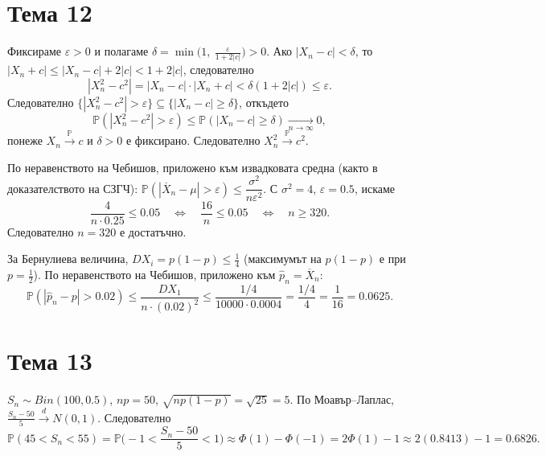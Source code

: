 \section*{Тема 12}

\begin{proofbox}
Фиксираме $\varepsilon>0$ и полагаме $\delta=\min\big(1,\
\tfrac\varepsilon{1+2|c|}\big)>0$. Ако $|X_n-c|<\delta$, то $|X_n+c|
\le|X_n-c|+2|c| < 1+2|c|$, следователно
\[
  |X_n^2-c^2| = |X_n-c|\cdot|X_n+c| < \delta(1+2|c|) \le
  \varepsilon.
\]
Следователно $\{|X_n^2-c^2|>\varepsilon\}\subseteq\{|X_n-c|\ge
\delta\}$, откъдето
\[
  \mathbb P(|X_n^2-c^2|>\varepsilon) \le \mathbb P(|X_n-c|\ge\delta)
  \xrightarrow[n\to\infty]{}0,
\]
понеже $X_n\xrightarrow{\mathbb P}c$ и $\delta>0$ е фиксирано.
Следователно $X_n^2\xrightarrow{\mathbb P}c^2$. \qedbg
\end{proofbox}

\begin{proofbox}
По неравенството на Чебишов, приложено към извадковата средна (както
в доказателството на СЗГЧ): $\mathbb P(|\overline X_n-\mu|>\varepsilon)
\le \dfrac{\sigma^2}{n\varepsilon^2}$. С $\sigma^2=4$, $\varepsilon=
0.5$, искаме
\[
  \frac{4}{n\cdot0.25} \le 0.05 \quad\Longleftrightarrow\quad
  \frac{16}n\le0.05 \quad\Longleftrightarrow\quad n\ge320.
\]
Следователно $n=320$ е достатъчно.
\end{proofbox}

\begin{proofbox}
За Бернулиева величина, $DX_i=p(1-p)\le\tfrac14$ (максимумът на
$p(1-p)$ е при $p=\tfrac12$). По неравенството на Чебишов, приложено
към $\hat p_n=\overline X_n$:
\[
  \mathbb P(|\hat p_n-p|>0.02) \le \frac{DX_1}{n\cdot(0.02)^2} \le
  \frac{1/4}{10000\cdot0.0004} = \frac{1/4}{4} = \frac1{16} =
  0.0625.
\]
\end{proofbox}

\section*{Тема 13}

\begin{proofbox}
$S_n\sim Bin(100,0.5)$, $np=50$, $\sqrt{np(1-p)}=\sqrt{25}=5$. По
Моавър--Лаплас, $\tfrac{S_n-50}5\xrightarrow d N(0,1)$. Следователно
\[
  \mathbb P(45<S_n<55) = \mathbb P\Big(-1<\frac{S_n-50}5<1\Big)
  \approx \Phi(1)-\Phi(-1) = 2\Phi(1)-1 \approx 2(0.8413)-1 =
  0.6826.
\]
\end{proofbox}

